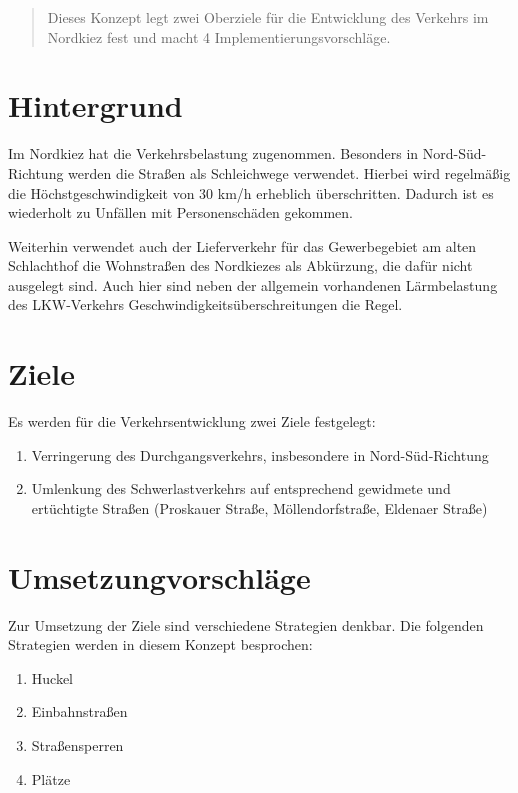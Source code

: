\documentclass[a4paper,10pt]{scrartcl}
\title{}
\author{Verkehrskonzept Nordkiez}
\begin{document}
\maketitle

\begin{abstract}
Dieses Konzept legt zwei Oberziele für die Entwicklung des Verkehrs im Nordkiez fest und macht 4 Implementierungsvorschläge.
\end{abstract}

\section{Hintergrund}
Im Nordkiez hat die Verkehrsbelastung zugenommen. Besonders in Nord-Süd-Richtung werden die Straßen als Schleichwege verwendet. Hierbei wird regelmäßig die Höchstgeschwindigkeit von 30 km/h erheblich überschritten. Dadurch ist es wiederholt zu Unfällen mit Personenschäden gekommen. 

Weiterhin verwendet auch der Lieferverkehr für das Gewerbegebiet am alten Schlachthof die Wohnstraßen des Nordkiezes als Abkürzung, die dafür nicht ausgelegt sind. Auch hier sind neben der allgemein vorhandenen Lärmbelastung des LKW-Verkehrs   Geschwindigkeitsüberschreitungen die Regel.

\section{Ziele}
Es werden für die Verkehrsentwicklung zwei Ziele festgelegt:
\begin{enumerate}
 \item Verringerung des Durchgangsverkehrs, insbesondere in Nord-Süd-Richtung 
 \item Umlenkung des Schwerlastverkehrs auf entsprechend gewidmete und ertüchtigte Straßen (Proskauer Straße, Möllendorfstraße, Eldenaer Straße)
\end{enumerate}


\section{Umsetzungvorschläge}
Zur Umsetzung der Ziele sind verschiedene Strategien denkbar. Die folgenden Strategien werden in diesem Konzept besprochen:
\begin{enumerate}
 \item Huckel 
 \item Einbahnstraßen 
 \item Straßensperren
 \item Plätze
\end{enumerate}
\end{document}
